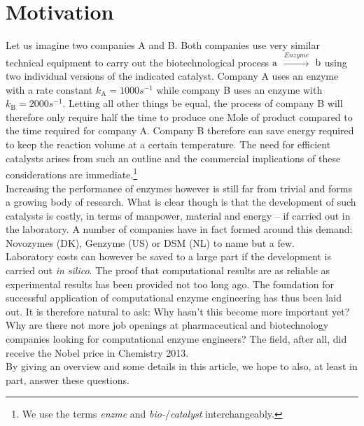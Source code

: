 \section{Motivation}\label{sec:mot}
Let us imagine two companies A and B.
Both companies use very similar technical equipment to carry out the biotechnological process $\ce{a}$ $\xrightarrow{Enzyme}$ $\ce{b}$ using two individual versions of the indicated catalyst.
Company A uses an enzyme with a rate constant $k_\text{A} = 1000s^{-1}$ while company B uses an enzyme with $k_\text{B} = 2000s^{-1}$.
Letting all other things be equal, the process of company B will therefore only require half the time to produce one Mole of product compared to the time required for company A.
Company B therefore can save energy required to keep the reaction volume at a certain temperature.
The need for efficient catalysts arises from such an outline and the commercial implications of these considerations are immediate.\footnote{We use the terms \textit{enzme} and \textit{bio-}/\textit{catalyst} interchangeably.}\\
Increasing the performance of enzymes however is still far from trivial and forms a growing body of research.
What is clear though is that the development of such catalysts is costly, in terms of manpower, material and energy -- if carried out in the laboratory.
A number of companies have in fact formed around this demand: Novozymes (DK), Genzyme (US) or DSM (NL) to name but a few\cite{meyer2013use, kirk2002industrial, beilen2002enzyme, schmid2002use}.\\
Laboratory costs can however be saved to a large part if the development is carried out \textit{in silico}.
The proof that computational results are as reliable as experimental results has been provided not too long ago\cite{claeyssens2006high}.
The foundation for successful application of computational enzyme engineering has thus been laid out.
It is therefore natural to ask: Why hasn't this become more important yet?
Why are there not more job openings at pharmaceutical and biotechnology companies looking for computational enzyme engineers?
The field, after all, did receive the Nobel price in Chemistry 2013.\\
By giving an overview and some details in this article, we hope to also, at least in part, answer these questions.



